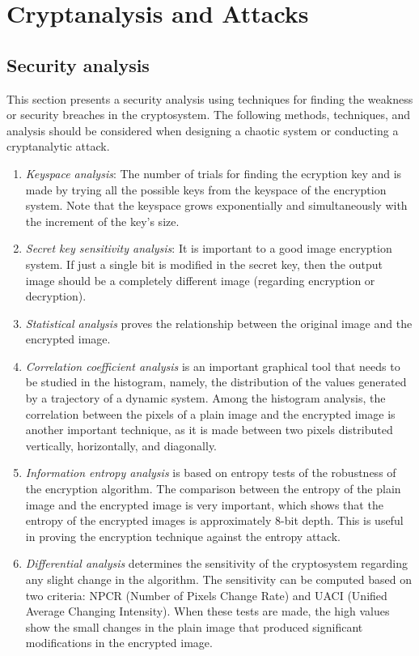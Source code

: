 \documentclass[a4paper, 12pt]{book} %
\begin{document}
\chapter{Cryptanalysis and Attacks}


\section{Security analysis}
This section presents a security analysis using techniques for finding the weakness or security breaches in the cryptosystem. The following methods, techniques, and analysis should be considered when designing a chaotic system or conducting a cryptanalytic attack.

\begin{enumerate}
    \item \emph{Keyspace analysis}: The number of trials for finding the
 ecryption key and is made by trying all the possible keys from the keyspace of the encryption system. Note that the keyspace grows exponentially and simultaneously with the increment of the key's size.
    \item \emph{Secret key sensitivity analysis}: It is important to a good image encryption system. If just a single bit is modified in the secret key, then the output image should be a completely different image (regarding encryption or decryption).
    \item \emph{Statistical analysis} proves the relationship between the original image and the encrypted image.
    \item \emph{Correlation coefficient analysis} is an important graphical tool that needs to be studied in the histogram, namely, the distribution of the values generated by a trajectory of a dynamic system. Among the histogram analysis, the correlation between the pixels of a plain image and the encrypted image is another important technique, as it is made between two pixels distributed vertically, horizontally, and diagonally.
    \item \emph{Information entropy analysis} is based on entropy tests of the robustness of the encryption algorithm. The comparison between the entropy of the plain image and the encrypted image is very important, which shows that the entropy of the encrypted images is approximately 8-bit depth. This is useful in proving the encryption technique against the entropy attack.
    \item \emph{Differential analysis} determines the sensitivity of the cryptosystem regarding any slight change in the algorithm. The sensitivity can be computed based on two criteria: NPCR (Number of Pixels Change Rate) and UACI (Unified Average Changing Intensity). When these tests are made, the high values show the small changes in the plain image that produced significant modifications in the encrypted image.
\end{enumerate}
\end{document}
